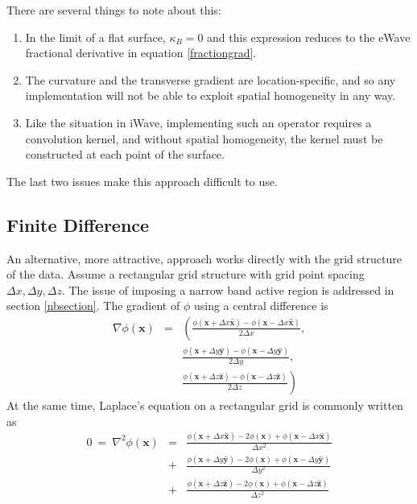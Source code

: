 \documentclass{article}
\def\xvec{\textbf{x}}
\def\dx{\Delta x}
\def\dy{\Delta y}
\def\dx{\Delta x}
\def\dy{\Delta y}
\def\dz{\Delta z}
\def\xhat{\hat{\textbf{x}}}
\def\yhat{\hat{\textbf{y}}}
\def\zhat{\hat{\textbf{z}}}
\begin{document}
There are several things to note about this: 
\begin{enumerate}
\item In the limit of a flat surface, $\kappa_B=0$ and this expression reduces to the eWave fractional derivative in equation \ref{fractiongrad}.

\item The curvature and the transverse gradient are location-specific, and so any implementation will not be able to exploit spatial homogeneity in any way.

\item Like the situation in iWave, implementing such an operator requires a convolution kernel, and without spatial homogeneity, the kernel must be constructed at each point of the surface.

\end{enumerate} 
The last two issues make this approach difficult to use.

\subsection{Finite Difference}
An alternative, more attractive, approach works directly with the grid structure of the data.  Assume a rectangular grid structure with grid point spacing $\dx, \dy, \dz$.  The issue of imposing a narrow band active region is addressed in section \ref{nbsection}.  The gradient of $\phi$ using a central difference is
\begin{eqnarray}
\nabla\phi(\xvec) &=& \left(  \frac{\phi(\xvec + \dx \xhat) - \phi(\xvec - \dx \xhat) }{2\dx},\right. \nonumber \\
&&   \frac{\phi(\xvec + \dy \yhat) - \phi(\xvec - \dy \yhat) }{2\dy}, \nonumber \\
&& \left.  \frac{\phi(\xvec + \dz \zhat) - \phi(\xvec - \dz \zhat) }{2\dz}  \right)
\end{eqnarray}
At the same time, Laplace's equation on a rectangular grid is commonly written as
\begin{eqnarray}
0 \ =\ \nabla^2\phi(\xvec) &=& \frac{\phi(\xvec + \dx \xhat) -2\phi(\xvec) + \phi(\xvec - \dx \xhat) }{\dx^2} \nonumber \\
&+&                     \frac{\phi(\xvec + \dy \yhat) -2\phi(\xvec) + \phi(\xvec - \dy \yhat) }{\dy^2} \nonumber \\
&+&                     \frac{\phi(\xvec + \dz \zhat) -2\phi(\xvec) + \phi(\xvec - \dz \zhat) }{\dz^2}
\label{gridlaplace}
\end{eqnarray}
\end{document}
